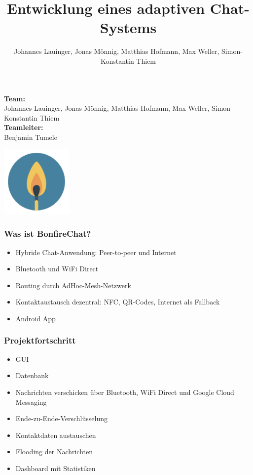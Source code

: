 \documentclass[accentcolor=tud4c,colorbacktitle]{tudbeamer}
\title{Entwicklung eines adaptiven Chat-Systems}
\author{Johannes Lauinger, Jonas Mönnig, Matthias Hofmann, Max Weller, Simon-Konstantin Thiem}
\begin{document}
  \begin{titleframe}
    \textbf{Team:}\\
    Johannes Lauinger, Jonas Mönnig, Matthias Hofmann, Max Weller, Simon-Konstantin Thiem\\
    \vspace{0.5cm}
    \textbf{Teamleiter:}\\
    Benjamin Tumele
    \begin{flushright}
      \includegraphics[height=3.5cm]{icon.png}
    \end{flushright}
  \end{titleframe}

  \begin{frame}
    \frametitle{Was ist BonfireChat?}
    \begin{itemize}
      \item Hybride Chat-Anwendung: Peer-to-peer und Internet
      \item Bluetooth und WiFi Direct
      \item Routing durch AdHoc-Mesh-Netzwerk
      \item Kontaktaustausch dezentral: NFC, QR-Codes, Internet als Fallback
      \item Android App
    \end{itemize}
  \end{frame}

  \begin{frame}
    \frametitle{Projektfortschritt}
    \begin{itemize}
      \item GUI
      \item Datenbank
      \item Nachrichten verschicken über Bluetooth, WiFi Direct und Google Cloud Messaging
      \item Ende-zu-Ende-Verschlüsselung
      \item Kontaktdaten austauschen
      \item Flooding der Nachrichten
      \item Dashboard mit Statistiken
    \end{itemize}
  \end{frame}
\end{document}
